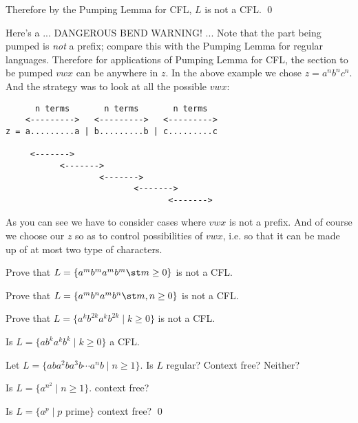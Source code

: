 Therefore by the Pumping Lemma for CFL, $L$ is not a CFL. 
\qed

Here's a ... DANGEROUS BEND WARNING! ...
Note that the part being pumped is \textit{not} a prefix;
compare this with the Pumping Lemma for regular languages.
Therefore for applications of Pumping Lemma for CFL, the section to be pumped
$vwx$ can be anywhere in $z$.
In the above example we chose $z = a^n b^n c^n$.
And the strategy was to look at all the possible $vwx$:
\begin{verbatim}
      n terms       n terms       n terms
    <--------->   <--------->   <--------->
z = a.........a | b.........b | c.........c

     <------->
           <------->
                   <------->
                          <------->
                                 <------->
\end{verbatim}

As you can see we have to consider cases where $vwx$ is not a prefix.
And of course we choose our $z$ so as to control possibilities of $vwx$, i.e.
so that it can be made up of at most two type of characters.




\newpage
\begin{ex}
Prove that $L = \{ a^m b^m a^m b^m \st m \geq 0 \}$ is not a CFL.
\end{ex}



\newpage
\begin{ex}
Prove that $L = \{ a^m b^n a^m b^n \st m, n \geq 0 \}$ is not a CFL.
\end{ex}

\newpage
\begin{ex}
Prove that $L = \{ a^k b^{2k} a^k b^{2k} \mid k \geq 0 \}$ is not a CFL.
\end{ex}

\newpage
\begin{ex}
Is $L = \{ a b^{k} a^k b^{k} \mid k \geq 0 \}$ a CFL.
\end{ex}


\newpage
\begin{ex}
Let $L = \{ a b a^2 b a^3 b \cdots a^n b \mid n \geq 1 \}$.
Is $L$ regular? Context free? Neither?
\end{ex}


\newpage
\begin{ex}
Is $L = \{ a^{n^2} \mid n \geq 1 \}$.
context free?
\end{ex}

\newpage
\begin{ex}
Is $L = \{ a^p \mid p \text { prime}\}$
context free?
\qed
\end{ex}




